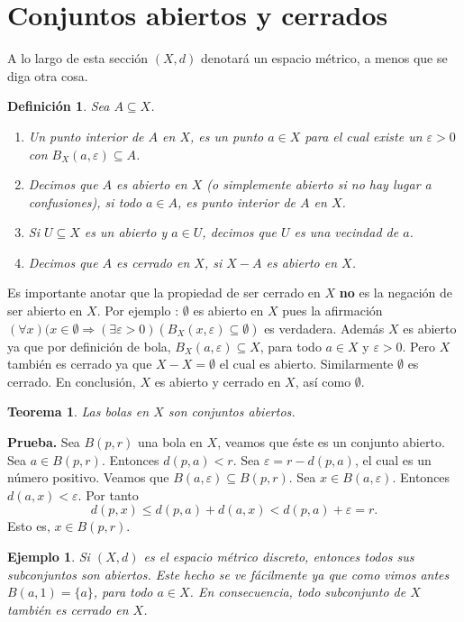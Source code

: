 \documentclass[x11names, 12pt]{book}
\newtheorem{definicion}{Definición}
\newtheorem{teorema}{Teorema}
\newtheorem{example}{Ejemplo}
\begin{document}
\section{Conjuntos abiertos y cerrados}
A lo largo de esta sección $(X,d)$ denotará un espacio métrico, a menos que se diga otra cosa.
\begin{definicion}
    Sea $A\subseteq X$.
    \begin{enumerate}
        \item Un punto interior de $A$ en $X$, es un punto $a\in X$ para el cual existe un $\varepsilon>0$ con $B_X(a, \varepsilon) \subseteq A$.
        \item Decimos que $A$ es abierto en $X$ (o simplemente abierto si no hay lugar a confusiones), si todo $a\in A$, es punto interior de $A$ en $X$.
        \item Si $U\subseteq X$ es un abierto y $a\in U$, decimos que $U$ es una vecindad de $a$.
        \item Decimos que $A$ es cerrado en $X$, si $X-A$ es abierto en $X$.
       
    \end{enumerate}
\end{definicion}
    Es importante anotar que la propiedad de ser cerrado en $X$ \textbf{no} es la negación de ser abierto en $X$. Por ejemplo : $\emptyset$ es abierto en $X$ pues la afirmación $(\forall x)(x\in \emptyset \Rightarrow (\exists \varepsilon>0 )(B_X(x,\varepsilon)\subseteq \emptyset)$ es verdadera. Además $X$ es abierto ya que por definición de bola, $B_X(a,\varepsilon)\subseteq X$, para todo $a\in X$ y $\varepsilon>0$. Pero  $X$ también es cerrado ya que $X-X=\emptyset$ el cual es abierto. Similarmente $\emptyset$ es cerrado. En conclusión, $X$ es abierto y cerrado en $X$, así como $\emptyset$.
   
    \begin{teorema}
    Las bolas en $X$ son conjuntos abiertos.
    \end{teorema}
    \textbf{Prueba.} Sea $B(p, r)$ una bola en $X$, veamos que éste es un conjunto abierto.  Sea $a\in B(p, r).$ Entonces $d(p,a)<r$. Sea $\varepsilon=r-d(p,a)$, el cual es un número positivo. Veamos que $B(a,\varepsilon)\subseteq B(p,r).$ Sea $x\in B(a,\varepsilon).$ Entonces $d(a,x)<\varepsilon.$ Por tanto
    $$d(p,x)\leq d(p,a)+d(a,x)<d(p,a)+\varepsilon=r.$$
Esto es, $x\in B(p,r)$.

\begin{example}
Si $(X,d)$ es el espacio métrico discreto, entonces todos sus subconjuntos son abiertos. Este hecho se ve fácilmente ya que como vimos antes $B(a,1)=\{a\}$, para todo $a\in X$. En consecuencia, todo subconjunto de $X$ también es cerrado en $X$.
\end{example}
\end{document}
